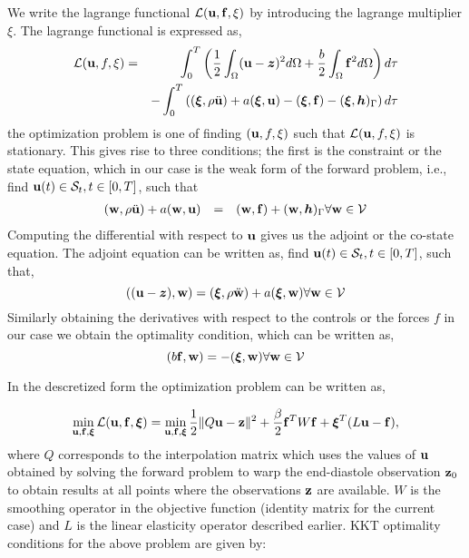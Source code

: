 \documentclass[10pt]{article}
\newcommand{\tmmathbf}[1]{\ensuremath{\boldsymbol{#1}}}
\begin{document}
We write the lagrange functional $\mathcal{L}(\mathbf{u},\mathbf{f}, \xi
)$ by introducing the lagrange multiplier $\xi$. The lagrange functional is
expressed as,
\begin{eqnarray*}
  \mathcal{L}(\bu, f, \xi ) & = & \int_0^T \left( \frac{1}{2}
  \int_{\Omega} (\bu-\tmmathbf{z})^2 d \Omega + \frac{b}{2}
  \int_{\Omega} \force^2 d \Omega \right) d \tau\\
  &  & - \int_0^T \left( (\tmmathbf{\xi}, \rho \ddot{\bu} ) +
  a (\tmmathbf{\xi},\bu) - (\tmmathbf{\xi},\force) -
  (\tmmathbf{\xi},\tmmathbf{h})_{\Gamma} \right) d \tau
\end{eqnarray*}
the optimization problem is one of finding $(\mathbf{u}, f, \xi )$ such that
$\mathcal{L}(\mathbf{u}, f, \xi )$ is stationary. This gives rise to three
conditions; the first is the constraint or the state equation, which in our
case is the weak form of the forward problem, i.e., find $\mathbf{u}( t )
\in \mathcal{S}_t, t \in [ 0, T ]$, such that
\[ \begin{array}{lll}
     (\bw, \rho \ddot{\bu} ) + a (\bw,\bu)
     & = & (\bw,\force) + (\bw,\tmmathbf{h})_{\Gamma}
     \forall \bw \in \mathcal{V}
   \end{array} \]
Computing the differential with respect to $\mathbf{u}$ gives us the adjoint
or the co-state equation. The adjoint equation can be written as, find
$\mathbf{u}( t ) \in \mathcal{S}_t, t \in [ 0, T ]$, such that,
\[ ( (\bu-\tmmathbf{z}),\bw) = (\tmmathbf{\xi}, \rho
   \ddot{\bw} ) + a (\tmmathbf{\xi},\bw) \forall
   \bw \in \mathcal{V} \]
Similarly obtaining the derivatives with respect to the controls or the forces
$f$ in our case we obtain the optimality condition, which can be written as,
\[ ( b\force,\bw) = - (\tmmathbf{\xi},\bw) \forall
   \bw \in \mathcal{V} \]

In the descretized form the optimization problem can be written as,

\begin{equation}
\min_{\mathbf{u},\mathbf{f},{\boldsymbol{\xi}}} \mathcal{L} (\mathbf{u}, \mathbf{f}, {\boldsymbol{\xi}}) = \min_{\mathbf{u},\mathbf{f},{\boldsymbol{\xi}}} \frac{1}{2} \Vert Q\mathbf{u} - \mathbf{z} \Vert^2 + \frac{\beta}{2} \mathbf{f}^TW\mathbf{f} + {\boldsymbol{\xi}}^T(L\mathbf{u} - \mathbf{f}),
\end{equation}
where $Q$ corresponds to the interpolation matrix which uses the values of $\mathbf{u}$ obtained by solving the forward problem to warp the end-diastole observation $\mathbf{z}_0$ to obtain results at all points where the observations $\mathbf{z}$ are available. $W$ is the smoothing operator in the objective function (identity matrix for the current case) and $L$ is the linear elasticity operator described earlier. KKT optimality conditions for the above problem are given by:
\end{document}
